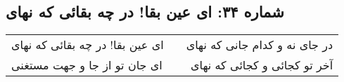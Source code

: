 \begin{center}
\section*{شماره ۳۴: ای عین بقا! در چه بقائی که نهای}
\label{sec:034}
\begin{longtable}{l p{0.5cm} r}
ای عین بقا! در چه بقائی که نهای
&&
در جای نه و کدام جانی که نهای
\\
ای جان تو از جا و جهت مستغنی
&&
آخر تو کجائی و کجائی که نهای
\\
\end{longtable}
\end{center}
